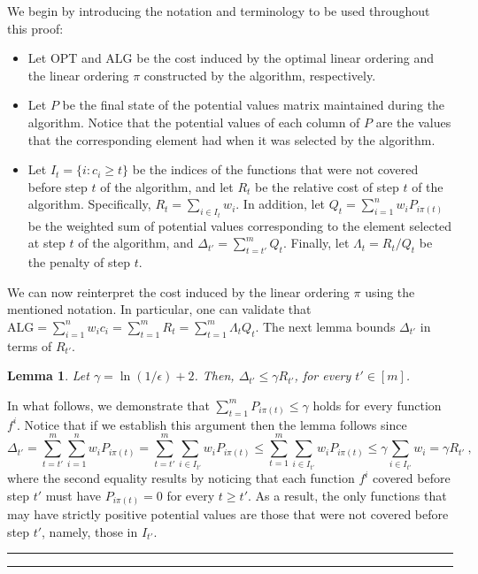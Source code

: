 \documentclass[11pt]{article}
\theoremstyle{plain}
\newtheorem{lemma}[theorem]{Lemma}
\theoremstyle{definition}
\newcommand{\qedsymb}{\hfill{\rule{2mm}{2mm}}}
\renewenvironment{proof}{\begin{trivlist} \item[\hspace{\labelsep}{\bf \noindent Proof.\/}] }{\qedsymb\end{trivlist}}\newenvironment{proofof}[1]{\begin{trivlist} \item[\hspace{\labelsep}{\bf \noindent Proof of #1.\/}] }{\qedsymb\end{trivlist}}\newenvironment{MyEqn}[1]{\setlength\arraycolsep{2pt}\begin{eqnarray*} #1}{\end{eqnarray*}}
\newcommand{\opt}{\mathrm{OPT}}
\newcommand{\alg}{\mathrm{ALG}}
\begin{document}
\begin{proof}
We begin by introducing the notation and terminology to be used
throughout this proof:

\begin{itemize}
\item Let $\opt$ and $\alg$ be the cost induced by the optimal
linear ordering and the linear ordering $\pi$ constructed by the
algorithm, respectively.

\item Let $P$ be the final state of the potential values matrix
maintained during the algorithm. Notice that the potential values
of each column of $P$ are the values that the corresponding
element had when it was selected by the algorithm.

\item Let $I_t = \{ i : c_i \geq t \}$ be the indices of the
functions that were not covered before step $t$ of the algorithm,
and let $R_t$ be the relative cost of step $t$ of the algorithm.
Specifically, $R_t = \sum_{i \in I_t} w_i$. In addition, let $Q_t
= \sum_{i=1}^{n} w_i P_{i\pi(t)}$ be the weighted sum of potential
values corresponding to the element selected at step $t$ of the
algorithm, and $\Delta_{t'} = \sum_{t = t'}^{m} Q_t$. Finally, let
$\Lambda_t = R_t / Q_t$ be the penalty of step $t$.
\end{itemize}

We can now reinterpret the cost induced by the linear ordering
$\pi$ using the mentioned notation. In particular, one can
validate that $\alg = \sum_{i=1}^{n} w_i c_i  = \sum_{t=1}^{m} R_t
= \sum_{t=1}^{m} \Lambda_t Q_t$. The next lemma bounds
$\Delta_{t'}$ in terms of $R_{t'}$.

\begin{lemma} \label{lemma:Width}
Let $\gamma = \ln(1 / \epsilon) + 2$. Then, $\Delta_{t'} \leq
\gamma R_{t'}$, for every $t' \in [m]$.
\end{lemma}
\begin{proof}
In what follows, we demonstrate that $\sum_{t = 1}^m P_{i \pi(t)}
\leq \gamma$ holds for every function $f^i$. Notice that if we
establish this argument then the lemma follows since
$$
\Delta_{t'} = \sum_{t = t'}^m \sum_{i=1}^{n} w_i P_{i\pi(t)} =
\sum_{t = t'}^m \sum_{i \in I_{t'}} w_i P_{i\pi(t)} \leq \sum_{t =
1}^m \sum_{i \in I_{t'}} w_i P_{i\pi(t)} \leq \gamma \sum_{i \in
I_{t'}} w_i = \gamma R_{t'} \ ,
$$
where the second equality results by noticing that each function
$f^i$ covered before step $t'$ must have $P_{i\pi(t)} = 0$ for
every $t \geq t'$. As a result, the only functions that may have
strictly positive potential values are those that were not covered
before step $t'$, namely, those in $I_{t'}$.


\end{proof}
\end{proof}
\end{document}
